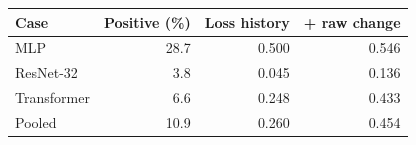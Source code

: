 \begin{tabular}{lrrr}
\hline
Case & Positive (\%) & Loss history & + raw change \\
\hline
MLP & 28.7 & 0.500 & 0.546 \\
ResNet-32 & 3.8 & 0.045 & 0.136 \\
Transformer & 6.6 & 0.248 & 0.433 \\
\hline
Pooled & 10.9 & 0.260 & 0.454 \\
\hline
\end{tabular}
